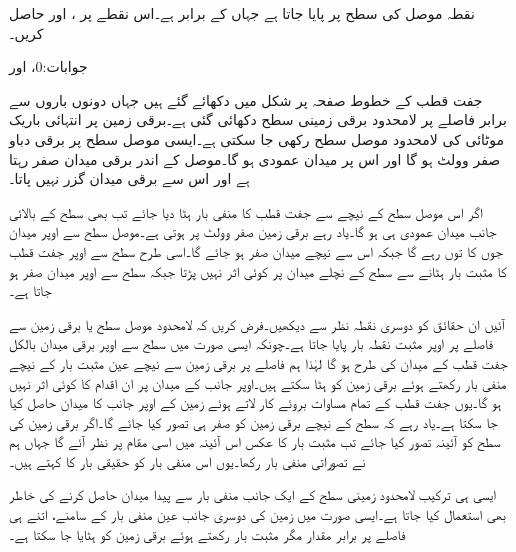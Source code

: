 نقطہ  موصل کی سطح پر پایا جاتا ہے جہاں  کے برابر ہے۔اس نقطے  پر ،  اور  حاصل کریں۔

جوابات:0،  اور 

جفت قطب کے خطوط صفحہ  پر  شکل  میں دکھائے گئے ہیں جہاں دونوں باروں سے برابر فاصلے پر لامحدود برقی زمینی سطح دکھائی گئی ہے۔برقی زمین پر انتہائی باریک موٹائی کی لامحدود موصل سطح رکھی جا سکتی ہے۔ایسی موصل سطح پر برقی دباو صفر وولٹ ہو گا اور اس پر میدان عمودی ہو گا۔موصل کے اندر برقی میدان صفر رہتا ہے اور اس سے برقی میدان گزر نہیں پاتا۔

اگر اس موصل سطح کے نیچے سے جفت قطب کا منفی بار ہٹا دیا جائے تب بھی سطح کے بالائی جانب میدان عمودی ہی ہو گا۔یاد رہے برقی زمین صفر وولٹ پر ہوتی ہے۔موصل سطح سے اوپر میدان جوں کا توں رہے گا جبکہ اس سے نیچے میدان صفر ہو جائے گا۔اسی طرح سطح سے اوپر  جفت قطب کا مثبت بار ہٹانے سے سطح کے نچلے میدان پر کوئی اثر نہیں پڑتا جبکہ سطح سے اوپر میدان صفر ہو جاتا ہے۔

آئیں ان حقائق کو دوسری نقطہ نظر سے دیکھیں۔فرض کریں کہ لامحدود موصل سطح یا برقی زمین سے  فاصلے پر  اوپر مثبت نقطہ بار  پایا جاتا ہے۔چونکہ ایسی صورت میں سطح سے اوپر برقی میدان بالکل جفت قطب کے میدان کی طرح ہو گا لہٰذا ہم  فاصلے پر برقی زمین سے نیچے عین مثبت بار کے نیچے منفی بار  رکھتے ہوئے برقی زمین کو ہٹا سکتے ہیں۔اوپر جانب کے میدان پر ان اقدام کا کوئی اثر نہیں ہو گا۔یوں جفت قطب کے تمام مساوات بروئے کار لاتے ہوئے زمین کے اوپر جانب کا میدان حاصل کیا جا سکتا ہے۔یاد رہے کہ سطح کے نیچے برقی زمین کو صفر ہی تصور کیا جائے گا۔اگر برقی زمین کی سطح کو آئینہ تصور کیا جائے تب مثبت بار کا عکس اس آئینہ میں اسی مقام پر نظر آئے گا جہاں ہم نے تصوراتی منفی بار رکھا۔یوں اس منفی بار کو حقیقی بار کا  کہتے ہیں۔

ایسی ہی ترکیب لامحدود زمینی سطح کے ایک جانب منفی بار سے پیدا میدان حاصل کرنے کی خاطر بھی استعمال کیا جاتا ہے۔ایسی صورت میں زمین کی دوسری جانب عین منفی بار کے سامنے،  اتنے ہی فاصلے پر برابر مقدار مگر مثبت بار رکھتے ہوئے برقی زمین کو ہٹایا جا سکتا ہے۔

